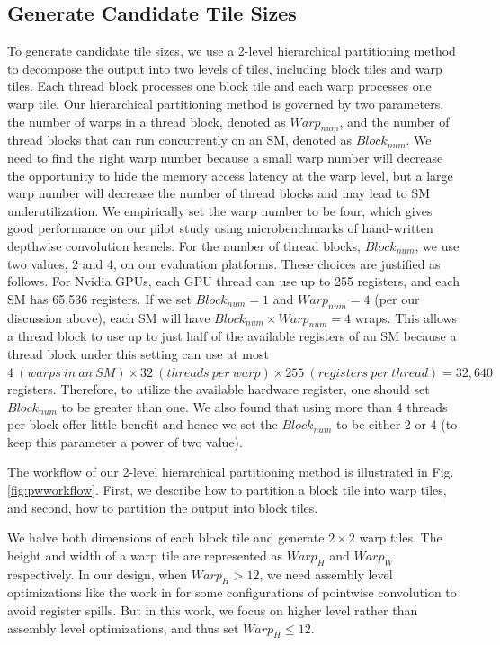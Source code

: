 \subsection{Generate Candidate Tile Sizes}
To generate candidate tile sizes, we use a 2-level hierarchical partitioning method to decompose the output into two levels of tiles, including block
tiles and warp tiles. Each thread block processes one block tile and each warp processes one warp tile.
Our hierarchical partitioning method is governed by two parameters, the number of warps in a thread block, denoted as $Warp_{num}$, and the
number of thread blocks that can run concurrently on an SM, denoted as $Block_{num}$. We need to find the right warp number because a small
warp number will decrease the opportunity to hide the memory access latency at the warp level, but a large warp number will decrease the
number of thread blocks and may lead to SM underutilization. We empirically set the warp number to be four, which gives good performance on
our pilot study using microbenchmarks of hand-written depthwise convolution kernels. For the number of thread blocks, $Block_{num}$, we use
two values, 2 and 4, on our evaluation platforms. These choices are justified as follows. For Nvidia GPUs, each GPU thread can use up to
255 registers, and each SM has 65,536 registers. If we set $Block_{num}=1$ and $Warp_{num}=4$ (per our discussion above), each SM will have $Block_{num} \times Warp_{num}=4$ wraps. This allows a thread block to use up to just half of the available registers of an
SM because a thread block under this setting can use at most $4\ (warps\ in\ an\ SM) \times 32\ (threads\ per\ warp) \times 255\ (registers\ per\ thread)=32,640$ registers. Therefore, to utilize the available hardware register, one should set $Block_{num}$ to be greater than one. We
also found that using more than 4 threads per block offer little benefit and hence we set the $Block_{num}$ to be either 2 or 4 (to keep
this parameter a power of two value).

The workflow of our 2-level hierarchical partitioning method is illustrated in Fig. \ref{fig:pwworkflow}. First, we describe how to
partition a block tile into warp tiles, and second, how to partition the output into block tiles.

We halve both dimensions of each block tile and generate $2 \times 2$ warp tiles. The height and width of a warp tile are represented as
$Warp_H$ and $Warp_W$ respectively. In our design, when $Warp_H > 12$, we need assembly level optimizations like the work in
\cite{yan2020optimizing,yan2020demystifying} for some configurations of pointwise convolution to avoid register spills. But in this work,
we focus on higher level rather than assembly level optimizations, and thus set $Warp_H \leq 12$.


